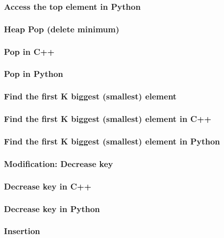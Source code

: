 \documentclass{article}
\begin{document}
\subsubsection*{Access the top element in Python}

\subsubsection{Heap Pop (delete minimum)}

\subsubsection*{Pop in C++}

\subsubsection*{Pop in Python}

\subsubsection{Find the first K biggest (smallest) element}

\subsubsection*{Find the first K biggest (smallest) element in C++}

\subsubsection*{Find the first K biggest (smallest) element in Python}

\subsubsection{Modification: Decrease key}

\subsubsection*{Decrease key in C++}

\subsubsection*{Decrease key in Python}

\subsubsection{Insertion}
\end{document}
